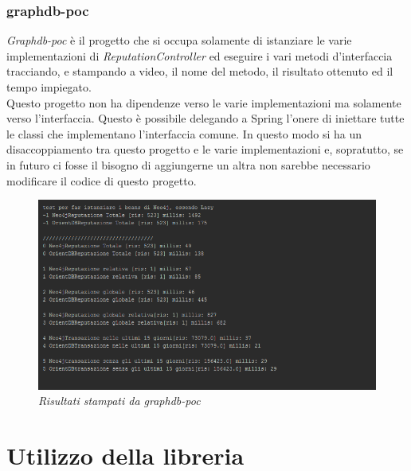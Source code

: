 \subsubsection{graphdb-poc}
\textit{Graphdb-poc} è il progetto che si occupa solamente di istanziare le varie implementazioni di \textit{ReputationController} ed eseguire i vari metodi d'interfaccia tracciando, e stampando a video, il nome del metodo, il risultato ottenuto ed il tempo impiegato.\\
Questo progetto non ha dipendenze verso le varie implementazioni ma solamente verso l'interfaccia. Questo è possibile delegando a Spring l'onere di iniettare tutte le classi che implementano l'interfaccia comune. In questo modo si ha un disaccoppiamento tra questo progetto e le varie implementazioni e, sopratutto, se in futuro ci fosse il bisogno di aggiungerne un altra non sarebbe necessario modificare il codice di questo progetto.
\begin{figure}[!ht]
	\centering
	\includegraphics[scale=0.75]{immagini/poc.png}
	\caption{\textit{Risultati stampati da graphdb-poc}}
\end{figure}
\newpage
\section{Utilizzo della libreria}

